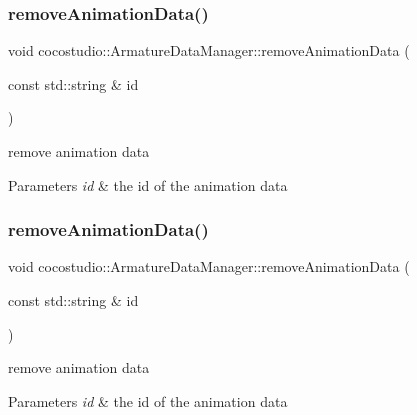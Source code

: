 \subsubsection{\texorpdfstring{remove\+Animation\+Data()}{removeAnimationData()}\hspace{0.1cm}{\footnotesize\ttfamily [1/2]}}
{\footnotesize\ttfamily void cocostudio\+::\+Armature\+Data\+Manager\+::remove\+Animation\+Data (\begin{DoxyParamCaption}\item[{const std\+::string \&}]{id }\end{DoxyParamCaption})}



remove animation data 


\begin{DoxyParams}{Parameters}
{\em id} & the id of the animation data \\
\hline
\end{DoxyParams}
\mbox{\label{classcocostudio_1_1ArmatureDataManager_a7355fd9a994fe9a51bc7b0ce35cb9008}} 
\subsubsection{\texorpdfstring{remove\+Animation\+Data()}{removeAnimationData()}\hspace{0.1cm}{\footnotesize\ttfamily [2/2]}}
{\footnotesize\ttfamily void cocostudio\+::\+Armature\+Data\+Manager\+::remove\+Animation\+Data (\begin{DoxyParamCaption}\item[{const std\+::string \&}]{id }\end{DoxyParamCaption})}



remove animation data 


\begin{DoxyParams}{Parameters}
{\em id} & the id of the animation data \\
\hline
\end{DoxyParams}
\mbox{\label{classcocostudio_1_1ArmatureDataManager_ab749f66043b0dd603720ff8c31f2a3b6}} 
